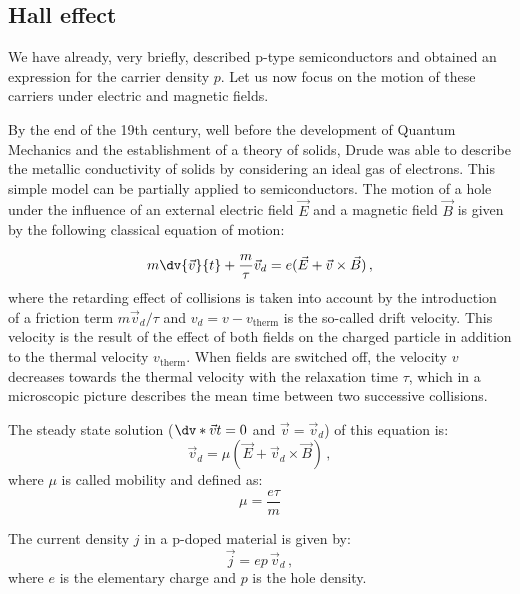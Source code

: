 \documentclass[11pt,a4paper]{article}
\begin{document}
\subsection{Hall effect}

We have already, very briefly, described p-type semiconductors and obtained an expression for the carrier density $p$. Let us now focus on the motion of these carriers under electric and magnetic fields.

By the end of the 19th century, well before the development of Quantum Mechanics and the establishment of a theory of solids, Drude was able to describe the metallic conductivity of solids by considering an ideal gas of electrons. This simple model can be partially applied to semiconductors. The motion of a hole under the influence of an external electric field $\vec{E}$ and a magnetic field $\vec{B}$ is given by the following classical equation of motion:

\begin{equation}\label{eq:Drude}
m\dv{\vec{v}}{t}+\frac{m}{\tau}\vec{v}_d=e(\vec{E}+\vec{v}\times\vec{B})\,,
\end{equation}
where the retarding effect of collisions is taken into account by the introduction of a friction term $m\vec{v}_d/\tau$ and $v_d=v-v_\text{therm}$ is the so-called drift velocity. This velocity is the result of the effect of both fields on the charged particle in addition to the thermal velocity $v_\text{therm}$. When fields are switched off, the velocity $v$ decreases towards the thermal velocity with the relaxation time $\tau$, which in a microscopic picture describes the mean time between two successive collisions.

The steady state solution ($\dv*{\vec{v}}{t}=0$ and $\vec{v}=\vec{v}_d$) of this equation is:
\begin{equation*}
\vec{v}_d=\mu (\vec{E}+\vec{v}_d\times\vec{B})\,,
\end{equation*}
where $\mu$ is called mobility and defined as:
\begin{equation}\label{eq:mobility}
\mu=\frac{e\tau}{m}
\end{equation}

The current density $j$ in a p-doped material is given by:
\begin{equation}\label{eq:current_density}
\vec{j}=ep\,\vec{v}_d\,,
\end{equation}
where $e$ is the elementary charge and $p$ is the hole density.
\end{document}
